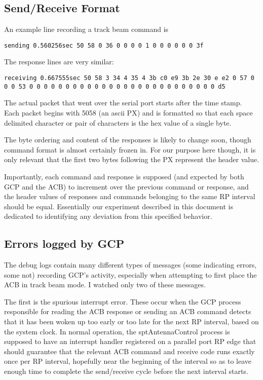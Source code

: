 \documentclass[12pt]{article}
\begin{document}
\subsection{Send/Receive Format}

An example line recording a track beam command is 
\begin{center}
\texttt{sending 0.560256sec 50 58 0 36 0 0 0 0 1 0 0 0 0 0 0 3f}
\end{center}
The response lines are very similar:
\begin{center}
\texttt{receiving 0.667555sec 50 58 3 34 4 35 4 3b c0 e9 3b 2e 30 e e2 0 57 0 0 0 53 0 0 0 0 0 0 0 0 0 0 0 0 0 0 0 0 0 0 0 0 0 0 0 0 0 0 d5 }
\end{center}

The actual packet that went over the serial port starts after the time stamp. Each packet begins with 5058 (an ascii PX) and is formatted so that each space delimited character or pair of characters is the hex value of a single byte.

The byte ordering and content of the responses is likely to change soon, though command format is almost certainly frozen in. For our purpose here though, it is only relevant that the first two bytes following the PX represent the header value.

Importantly, each command and response is supposed (and expected by both GCP and the ACB) to increment over the previous command or response, and the header values of responses and commands belonging to the same RP interval should be equal. Essentially our experiment described in this document is dedicated to identifying any deviation from this specified behavior.

\subsection{Errors logged by GCP}

The debug logs contain many different types of messages (some indicating errors, some not) recording GCP's activity, especially when attempting to first place the ACB in track beam mode. I watched only two of these messages.

The first is the spurious interrupt error. These occur when the GCP process responsible for reading the ACB response or sending an ACB command detects that it has been woken up too early or too late for the next RP interval, based on the system clock. In normal operation, the sptAntennaControl process is supposed to have an interrupt handler registered on a parallel port RP edge that should guarantee that the relevant ACB command and receive code runs exactly once per RP interval, hopefully near the beginning of the interval so as to leave enough time to complete the send/receive cycle before the next interval starts.
\end{document}
